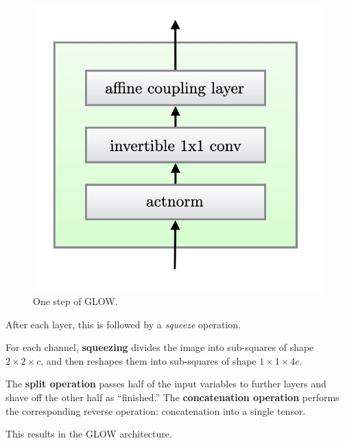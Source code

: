 \documentclass{article}
\begin{document}
  \begin{figure}[H]
    \centering 
    \includegraphics[scale=0.4]{img/glow_step.png}
    \caption{One step of GLOW.} 
    \label{fig:glow_step}
  \end{figure}

  After each layer, this is followed by a \textit{squeeze} operation. 

  \begin{definition}
    For each channel, \textbf{squeezing} divides the image into sub-squares of shape $2 \times 2 \times c$, and then reshapes them into sub-squares of shape $1 \times 1 \times 4c$. 
  \end{definition}


  \begin{definition}
    The \textbf{split operation} passes half of the input variables to further layers and shave off the other half as ``finished.'' The \textbf{concatenation operation} performs the corresponding reverse operation: concatenation into a single tensor. 
  \end{definition}

  This results in the GLOW architecture. 
\end{document}
